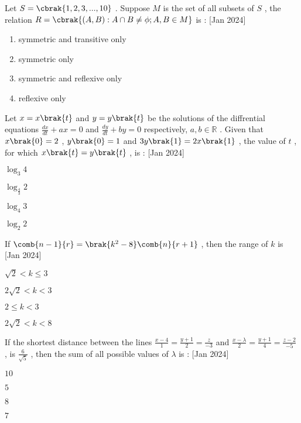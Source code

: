 \item Let $S=\cbrak{1,2,3,...,10}$  . Suppose $ M $ is the set of all subsets of $ S $ , the relation $R=\cbrak{ (A,B):A \cap B \neq \phi ;A,B \in M }$ is : \hfill{[Jan 2024]}
\begin{enumerate}
\item symmetric and transitive only 
\item symmetric only 
\item symmetric and reflexive only 
\item reflexive only 
\end{enumerate}
\item Let $x=x\brak{t}$ and $y=y\brak{t}$ be the solutions of the diffrential equations $\frac{dx}{dt}+ax=0$ and $\frac{dy}{dt}+by=0$ respectively, $a,b \in \mathbb{R}$ . Given that $x\brak{0}=2$ , $y\brak{0}=1$ and $3y\brak{1}=2x\brak{1}$ , the value of $t$ , for which $x\brak{t}=y\brak{t}$ , is :  \hfill{[Jan 2024]}
\begin{enumerate}   
\begin{multicols}{2}
\item $ \log_3 4 $
\item $ \log_{\frac{4}{3}} 2 $
\item $ \log_4 3 $
\item $ \log_2 2 $
\end{multicols}
\end{enumerate}
\item If $\comb{n-1}{r} = \brak{k^2 - 8}\comb{n}{r+1}$ , then the range of $k$ is \hfill{[Jan 2024]}
\begin{enumerate}
\begin{multicols}{2}
\item $ \sqrt{2}<k \leq 3 $
\item $ 2\sqrt{2}<k<3 $
\item $ 2 \leq k<3 $
\item $ 2\sqrt{2}<k<8 $
\end{multicols}
\end{enumerate} 
\item If the shortest distance between the lines $ \frac{x-4}{1}=\frac{y+1}{2}=\frac{z}{-3} $ and $ \frac{x-\lambda}{2}=\frac{y+1}{4}=\frac{z-2}{-5} $ , is $\frac{6}{\sqrt{5}}$ , then the sum of all possible values of $\lambda$ is : \hfill{[Jan 2024]}
\begin{enumerate}   
\begin{multicols}{4}
\item $10$
\item $5$
\item $8$
\item $7$                                                                        
\end{multicols}
\end{enumerate}
